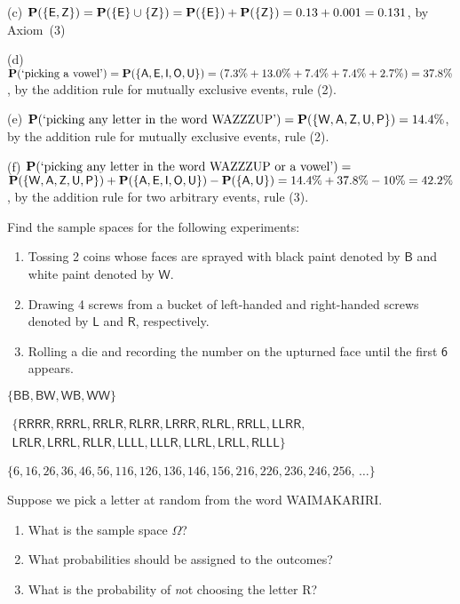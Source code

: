 \begin{ExerciseList}
{\item[(c)] $\mathbf{P}(\{\mathsf{E},\mathsf{Z}\}) =\mathbf{P}(\{\mathsf{E}\} \cup
    \{\mathsf{Z}\} ) =  \mathbf{P}(\{\mathsf{E}\})+\mathbf{P}(\{\mathsf{Z}\}) =
    0.13+0.001=0.131$, by Axiom~(3)
\item[(d)] $\mathbf{P}(\textrm{`picking a
    vowel'})=\mathbf{P}(\{\mathsf{A,E,I,O,U}\})=(7.3\%+13.0\%+7.4\%+7.4\%+2.7\%)=37.8\%$,  by the addition rule for mutually exclusive events, rule (2).
\item[(e)] $\mathbf{P}(\textrm{`picking any letter in the word
    WAZZZUP'})=\mathbf{P}(\{\mathsf{W,A,Z,U,P}\})=14.4\%$,  by the
  addition rule for mutually exclusive events, rule (2).
\item[(f)] $\mathbf{P}(\textrm{`picking any letter in the word WAZZZUP or a vowel'})=$\\
$\mathbf{P}(\{\mathsf{W,A,Z,U,P}\})+\mathbf{P}(\{\mathsf{A,E,I,O,U}\})-\mathbf{P}(\{\mathsf{A,U}\})
  = 14.4\% + 37.8\% - 10\% = 42.2\%$,  by the addition rule for two
arbitrary events, rule (3).
\eit
}


\Exercise
Find the sample spaces  for the following experiments:
\begin{enumerate}
\item Tossing 2 coins whose faces are sprayed with black paint denoted by $\mathsf{B}$ and white paint denoted by $\mathsf{W}$.
\item Drawing 4 screws from a bucket  of left-handed and right-handed screws
  denoted by $\mathsf{L}$ and $\mathsf{R}$, respectively.
\item Rolling a die and recording the number on the upturned face  until the first $\mathsf{6}$ appears.
\end{enumerate}
\Answer
\be
\item $\{\mathsf{BB},\mathsf{BW},\mathsf{WB},\mathsf{WW}\}$

\item $\begin{aligned}\{\mathsf{ RRRR,RRRL,RRLR,RLRR,LRRR,RLRL,RRLL,LLRR,}
    \\ \mathsf{LRLR,LRRL,RLLR,LLLL, LLLR,LLRL,LRLL,RLLL}\}\end{aligned}$
\item $\{6,16,26,36,46,56,116, 126,136, 146, 156,
      216, 226, 236, 246, 256, \,\ldots\}$
\ee


\Exercise
Suppose we pick a letter at random from the word WAIMAKARIRI. 
\begin{enumerate}
\item What is the sample space $\Omega$?
\item  What probabilities should be assigned to the outcomes?
\item What is the probability of {\emph not} choosing the letter  R?
\end{enumerate}
\Answer


\end{ExerciseList}
